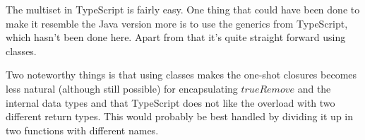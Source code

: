 The multiset in TypeScript is fairly easy.  One thing that could have
been done to make it resemble the Java version more is to use the
generics from TypeScript, which hasn't been done here.  Apart from
that it's quite straight forward using classes.

Two noteworthy things is that using classes makes the one-shot
closures becomes less natural (although still possible) for
encapsulating $trueRemove$ and the internal data types and that
TypeScript does not like the overload with two different return types.
This would probably be best handled by dividing it up in two functions
with different names.
